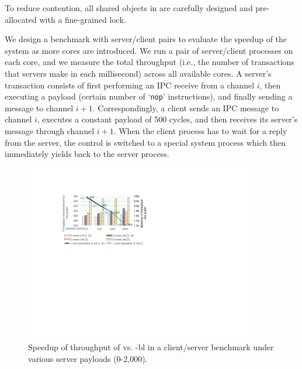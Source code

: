 To reduce contention, all shared objects in {\cCTOS} are carefully
designed and pre-allocated with a fine-grained lock.
We design a benchmark
with server/client pairs to evaluate the speedup of the system as more
cores are introduced.  
We run a pair of server/client processes on each
core, and we measure the total throughput (i.e., the number of
transactions that servers make in each millisecond) across all
available cores.
A server's transaction consists of first performing an IPC receive
from a channel $i$, then executing a payload (certain number of
`\texttt{nop}' instructions), and finally sending a message to channel
$i + 1$. Correspondingly, a client sends an IPC message to channel
$i$, executes a constant payload of 500 cycles, and then receives its
server's message through channel $i + 1$.  When the client process has
to wait for a reply from the server, the control is switched to a
special system process which then immediately yields back to the server
process. 

\begin{figure}\centering
	\hspace{-.2cm}
	\includegraphics[width=10cm]{figs/speedup_big_lock.pdf}
	\hspace{-.2cm}
	\caption{Speedup of throughput of \cCTOS{} vs. {\cCTOS-bl} in a client/server benchmark under various server payloads (0-2,000).}
	\label{fig:speedup_big_lock}
\end{figure}


